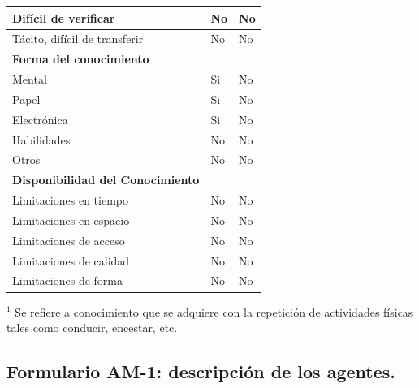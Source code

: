 \documentclass[12pt,a4paper,twoside,spanish]{article}      %
\newcommand{\PreserveBackslash}[1]{\let\temp=\\#1\let\\=\temp}
\let\PBS=\PreserveBackslash
\begin{document}
\begin{table}[H]
\begin{tabularx}{\textwidth}{|p{5cm}|>{\PBS\raggedright}p{0.8cm}|X|}
                Difícil de verificar& No & No\\ \hline 

                Tácito, difícil de transferir& No & No \\ \hline 

                \textbf{Forma del conocimiento} & &\\ \hline

                Mental& Si & No\\ \hline

                Papel& Si & No\\ \hline 

                Electrónica& Si  & No\\ \hline

                Habilidades&No  & No\\ \hline 

                Otros& No & No\\ \hline 

                \textbf{Disponibilidad del Conocimiento} &  &\\ \hline 

                Limitaciones en tiempo& No  & No\\ \hline

                Limitaciones en espacio& No & No \\ \hline 

                Limitaciones de acceso& No & No \\ \hline 

                Limitaciones de calidad& No & No \\ \hline 

                Limitaciones de forma& No & No \\ \hline

            \end{tabularx}
            \label{tab.TM2}
        \end{table}


        

        
        
        {\scriptsize \noindent $^1$ Se refiere a conocimiento que se
        adquiere con la repetición de actividades físicas tales como
        conducir, encestar, etc.}
        
        \pagebreak
        
    \subsection{Formulario AM-1: descripción de los agentes.}
        
\end{document}
